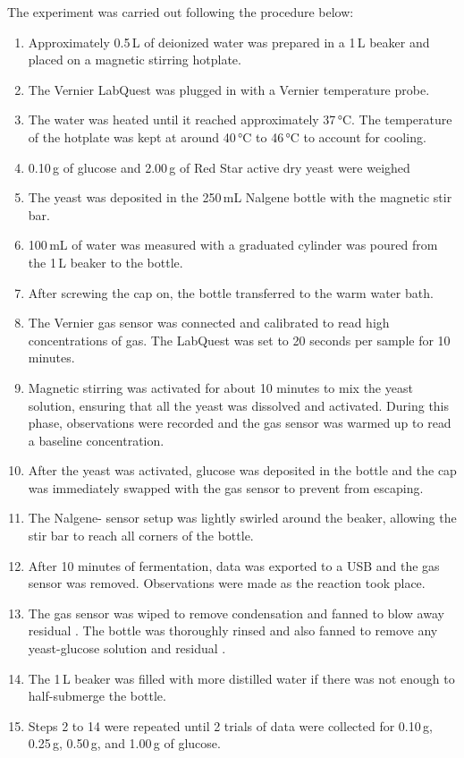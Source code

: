 \documentclass{article}
\begin{document}
The experiment was carried out following the procedure below:
\begin{enumerate}[topsep=\parskip, noitemsep]
    \item Approximately 0.5\,\si{L} of deionized water was prepared in a 1\,\si{L} beaker and placed on a magnetic stirring hotplate.
    \item The Vernier LabQuest was plugged in with a Vernier temperature probe.
    \item The water was heated until it reached approximately 37\,\si{\celsius}. The temperature of the hotplate was kept at around 40\,\si{\celsius} to 46\,\si{\celsius} to account for cooling.
    \item 0.10\,\si{g} of glucose and 2.00\,\si{g} of Red Star active dry yeast were weighed
    \item The yeast was deposited in the 250\,\si{mL} Nalgene bottle with the magnetic stir bar.
    \item 100\,\si{mL} of water was measured with a graduated cylinder was poured from the 1\,\si{L} beaker to the bottle.
    \item After screwing the cap on, the bottle transferred to the warm water bath.
    \item The Vernier  gas sensor was connected and calibrated to read high concentrations of  gas. The LabQuest was set to 20 seconds per sample for 10 minutes.
    \item Magnetic stirring was activated for about 10 minutes to mix the yeast solution, ensuring that all the yeast was dissolved and activated. During this phase, observations were recorded and the  gas sensor was warmed up to read a baseline  concentration.
    \item After the yeast was activated, glucose was deposited in the bottle and the cap was immediately swapped with the  gas sensor to prevent  from escaping.
    \item The Nalgene- sensor setup was lightly swirled around the beaker, allowing the stir bar to reach all corners of the bottle.
    \item After 10 minutes of fermentation, data was exported to a USB and the  gas sensor was removed. Observations were made as the reaction took place.
    \item The  gas sensor was wiped to remove condensation and fanned to blow away residual . The bottle was thoroughly rinsed and also fanned to remove any yeast-glucose solution and residual .
    \item The 1\,\si{L} beaker was filled with more distilled water if there was not enough to half-submerge the bottle.
    \item Steps 2 to 14 were repeated until 2 trials of data were collected for 0.10\,\si{g}, 0.25\,\si{g}, 0.50\,\si{g}, and 1.00\,\si{g} of glucose.
\end{enumerate}
\end{document}
